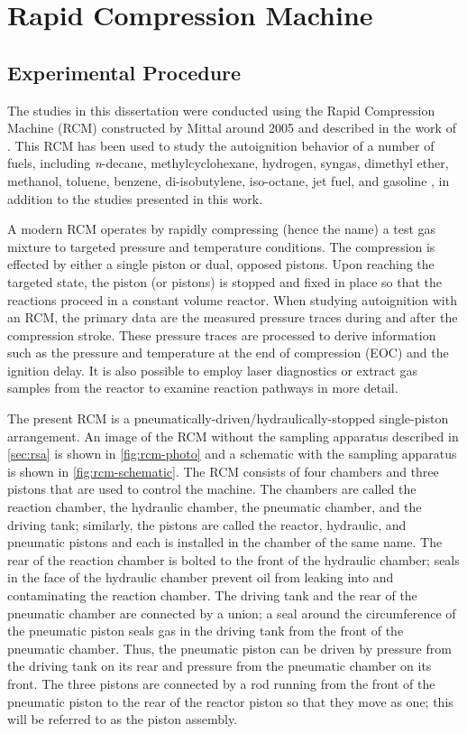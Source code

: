 \documentclass[../main.tex]{subfiles}
\begin{document}
\section{Rapid Compression Machine}
\label{sec:rcm}
\subsection{Experimental Procedure}
The studies in this dissertation were conducted using the Rapid
Compression Machine (RCM) constructed by Mittal around 2005 and described in the
work of \textcite{Mittal2007,Mittal2006a}. This RCM has been used to
study the autoignition behavior of a number of fuels, including
\textit{n}-decane, methylcyclohexane, hydrogen, syngas,
dimethyl ether, methanol, toluene, benzene, di-isobutylene, iso-octane,
jet fuel, and gasoline \cite{Kumar2009, Mittal2009, Das2012a, Mittal2006,
Das2012, Mittal2008a, Kumar2011a, Mittal2007a, Mittal2008, Kumar2010,
Dooley2010, Dooley2012, Hui2012a, Keromnes2013, Kukkadapu2013, Kukkadapu2012a},
in addition to the studies presented in this work.

A modern RCM operates by rapidly compressing (hence the name) a test gas
mixture to targeted pressure and temperature conditions. The compression
is effected by either a single piston or dual, opposed pistons. Upon
reaching the targeted state, the piston (or pistons) is stopped and
fixed in place so that the reactions proceed in a constant volume
reactor. When studying autoignition with an RCM, the primary data are
the measured pressure traces during and after the compression stroke.
These pressure traces are processed to derive information such as the
pressure and temperature at the end of compression (EOC) and the
ignition delay. It is also possible to employ laser diagnostics or
extract gas samples from the reactor to examine reaction pathways in
more detail.

The present RCM is a pneumatically-driven/hydraulically-stopped
single-piston arrangement. An image of the RCM without the sampling
apparatus described in \cref{sec:rsa} is shown in
\cref{fig:rcm-photo} and a schematic with the sampling apparatus is
shown in \cref{fig:rcm-schematic}. The RCM consists of four chambers and
three pistons that are used to control the machine. The chambers are
called the reaction chamber, the hydraulic chamber, the pneumatic
chamber, and the driving tank; similarly, the pistons are called
the reactor, hydraulic, and pneumatic pistons and each is installed
in the chamber of the same name. The rear of the reaction chamber
is bolted to the front of the hydraulic chamber; seals in the face
of the hydraulic chamber prevent oil from leaking into and contaminating
the reaction chamber. The driving tank and the rear of the pneumatic
chamber are connected by a union; a seal around the circumference of
the pneumatic piston seals gas in the driving tank from the front of
the pneumatic chamber. Thus, the pneumatic piston can be driven by
pressure from the driving tank on its rear and pressure from the
pneumatic chamber on its front. The three pistons are connected by
a rod running from the front of the pneumatic piston to the rear of
the reactor piston so that they move as one; this will be referred
to as the piston assembly.
\end{document}
